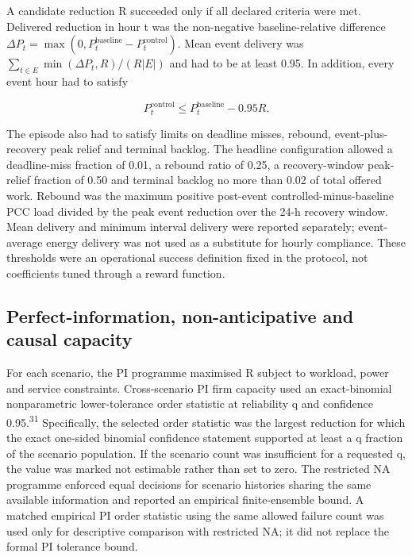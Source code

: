 \documentclass[10pt,a4paper]{article}
\begin{document}
A candidate reduction R succeeded only if all declared criteria were met. Delivered reduction in hour t was the non-negative baseline-relative difference \(\Delta P_t=\max(0,P^{\mathrm{baseline}}_t-P^{\mathrm{control}}_t)\). Mean event delivery was \(\sum_{t\in E}\min(\Delta P_t,R)/(R|E|)\) and had to be at least 0.95. In addition, every event hour had to satisfy


\begin{equation*}
P^{\mathrm{control}}_t \leq P^{\mathrm{baseline}}_t-0.95R.
\end{equation*}

The episode also had to satisfy limits on deadline misses, rebound, event-plus-recovery peak relief and terminal backlog. The headline configuration allowed a deadline-miss fraction of 0.01, a rebound ratio of 0.25, a recovery-window peak-relief fraction of 0.50 and terminal backlog no more than 0.02 of total offered work. Rebound was the maximum positive post-event controlled-minus-baseline PCC load divided by the peak event reduction over the 24-h recovery window. Mean delivery and minimum interval delivery were reported separately; event-average energy delivery was not used as a substitute for hourly compliance. These thresholds were an operational success definition fixed in the protocol, not coefficients tuned through a reward function.


\subsection*{Perfect-information, non-anticipative and causal capacity}

For each scenario, the PI programme maximised R subject to workload, power and service constraints. Cross-scenario PI firm capacity used an exact-binomial nonparametric lower-tolerance order statistic at reliability q and confidence 0.95.\textsuperscript{31} Specifically, the selected order statistic was the largest reduction for which the exact one-sided binomial confidence statement supported at least a q fraction of the scenario population. If the scenario count was insufficient for a requested q, the value was marked not estimable rather than set to zero. The restricted NA programme enforced equal decisions for scenario histories sharing the same available information and reported an empirical finite-ensemble bound. A matched empirical PI order statistic using the same allowed failure count was used only for descriptive comparison with restricted NA; it did not replace the formal PI tolerance bound.
\end{document}
